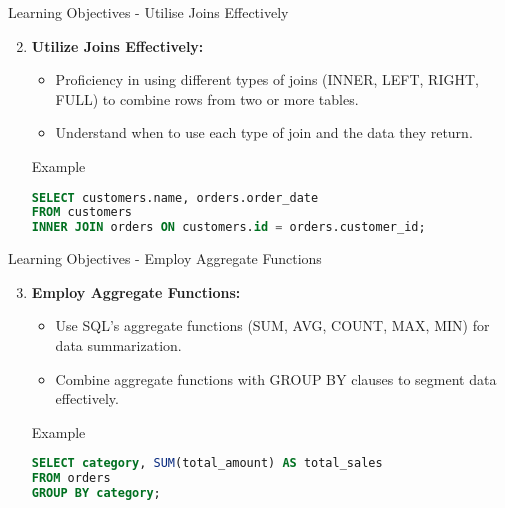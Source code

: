 \documentclass[aspectratio=169]{beamer}
\begin{document}
\begin{frame}[fragile]{Learning Objectives - Utilise Joins Effectively}
    \begin{enumerate}
        \setcounter{enumi}{1}
        \item \textbf{Utilize Joins Effectively:}
        \begin{itemize}
            \item Proficiency in using different types of joins (INNER, LEFT, RIGHT, FULL) to combine rows from two or more tables.
            \item Understand when to use each type of join and the data they return.
        \end{itemize}
        
        \begin{block}{Example}
        \begin{lstlisting}[language=sql]
SELECT customers.name, orders.order_date 
FROM customers 
INNER JOIN orders ON customers.id = orders.customer_id;
        \end{lstlisting}
        \end{block}
    \end{enumerate}
\end{frame}

\begin{frame}[fragile]{Learning Objectives - Employ Aggregate Functions}
    \begin{enumerate}
        \setcounter{enumi}{2}
        \item \textbf{Employ Aggregate Functions:}
        \begin{itemize}
            \item Use SQL’s aggregate functions (SUM, AVG, COUNT, MAX, MIN) for data summarization.
            \item Combine aggregate functions with GROUP BY clauses to segment data effectively.
        \end{itemize}
        
        \begin{block}{Example}
        \begin{lstlisting}[language=sql]
SELECT category, SUM(total_amount) AS total_sales
FROM orders
GROUP BY category;
        \end{lstlisting}
        \end{block}
    \end{enumerate}
\end{frame}
\end{document}
